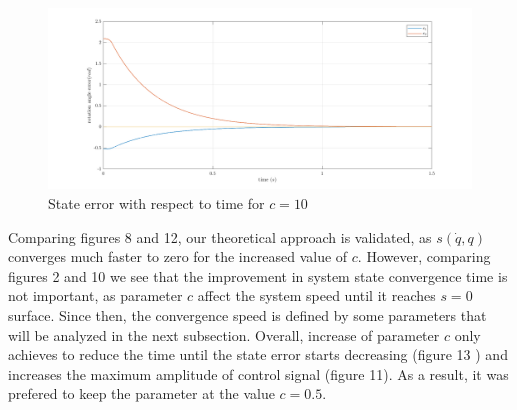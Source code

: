\documentclass[a4paper]{article}
\begin{document}
\begin{figure}[H]
    \centering
    \includegraphics[width=15cm]{fig/sim1/ec10.png}
    \caption{State error with respect to time for $c=10$}
\end{figure}

\noindent\hspace{-2pt}
Comparing figures 8 and 12, our theoretical approach is validated, as $s(\dot{q}, q)$ converges much faster to zero 
for the increased value of $c$. However, comparing figures 2 and 10 we see that the improvement in system state convergence time 
is not important, as parameter $c$ affect the system speed until it reaches $s=0$ surface. Since then, the convergence speed is 
defined by some parameters that will be analyzed in the next subsection. Overall, increase of parameter $c$ only achieves to 
reduce the time until the state error starts decreasing (figure 13 ) and increases the maximum amplitude of control signal (figure 11). 
As a result, it was prefered to keep the parameter at the value $c=0.5$.
\end{document}
